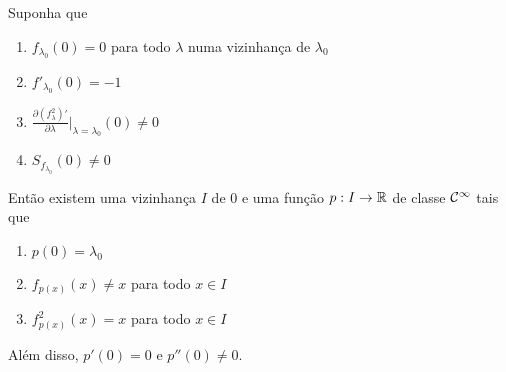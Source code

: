 \begin{theorem}
Suponha que
\begin{enumerate}
\item $f_{\lambda_0}(0) = 0$ para todo $\lambda$ numa vizinhança de $\lambda_0$
\item $f'_{\lambda_0}(0) = -1$
\item $\frac{\partial (f^2_\lambda)'}{\partial \lambda} |_{\lambda = \lambda_0}(0) \neq 0$
\item $S_{f_{\lambda_0}}(0) \neq 0$
\end{enumerate}
Então existem uma vizinhança $I$ de $0$ e uma função $p: I \to \mathbb{R}$ de classe $\mathcal{C}^\infty$ tais que 
\begin{enumerate}
\item $p(0) = \lambda_0$
\item $f_{p(x)}(x) \neq x$ para todo $x \in I$
\item $f^2_{p(x)}(x) = x$ para todo $x \in I$
\end{enumerate}
Além disso, $p'(0) = 0$ e $p''(0) \neq 0$.
\end{theorem}

